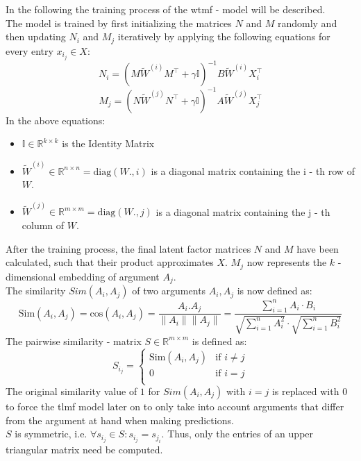 \noindent In the following the training process of the \acrshort{wtmf} - model will be described.\\
The model is trained by first initializing the matrices $N$ and $M$ randomly and then updating $N_i$ and $M_j$ iteratively by applying the following equations for every entry $x_i_j \in X$:
    \begin{equation}
        N_i = (M\tilde{W}^{(i)}M^\top + \gamma\mathbb{I})^{-1}B\tilde{W}^{(i)}X^\top_i
    \end{equation}
    \begin{equation}
        M_j =(N\tilde{W}^{(j)}N^\top + \gamma\mathbb{I})^{-1}A\tilde{W}^{(j)}X^\top_j 
    \end{equation}
In the above equations:
\begin{itemize}
    \item $\mathbb{I} \in \mathbb{R}^{k \times k}$  is the Identity Matrix
    \item $\tilde{W}^{(i)} \in \mathbb{R}^{n \times n} = \text{diag}(W.,i)$ is a diagonal matrix containing the i - th row of $W$.
    \item $\tilde{W}^{(j)} \in \mathbb{R}^{m \times m} = \text{diag}(W.,j)$ is a diagonal matrix containing the j - th column of $W$.
\end{itemize}
After the training process, the final latent factor matrices $N$ and $M$ have been calculated, such that their product approximates $X$.
$M_j$ now represents the $k$ - dimensional embedding of argument $A_j$.\\
The similarity $Sim(A_i, A_j)$ of two arguments $A_i, A_j$ is now defined as:
    \begin{equation}
        \text{Sim}(A_i, A_j) = \text{cos}(A_i, A_j) = \frac{A_i.A_j}{\|A_i\|\|A_j\|} = \frac{\sum_{i=1}^{n}A_i \cdot B_i}{\sqrt{\sum_{i=1}^{n}A_i^{2}} \cdot \sqrt{\sum_{i=1}^{n}B_i^{2}}}
    \end{equation}
The pairwise similarity - matrix $S \in \mathbb{R}^{m \times m}$ is defined as:
    \begin{equation}
        S_i_j = \left\{
	\begin{array}{ll}
		\text{Sim}(A_i, A_j)  & \mbox{if } i \neq j\\
		0 & \mbox{if } i=j \\
	\end{array}
\right.
    \end{equation}
The original similarity value of $1$ for $Sim(A_i, A_j)$ with $i=j$ is replaced with $0$ to force the \acrshort{tlmf} model later on to only take into account arguments that differ from the argument at hand when making predictions.\\
$S$ is symmetric, i.e. $\forall{s_i_j} \in S: s_i_j = s_j_i$. Thus, only the entries of an upper triangular matrix need be computed.

